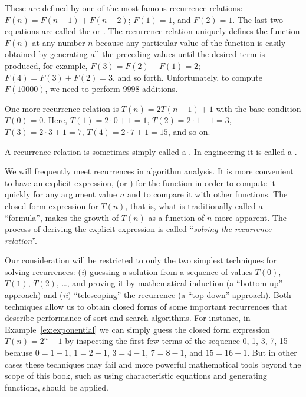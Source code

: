 \begin{Example}  
\label{ex:fibonacci}
These are defined by one of the most famous recurrence relations:
\(F(n) = F(n-1) + F(n-2)\); \(F(1)=1\), and \(F(2)=1\).
The last two equations are called the 
 or
. The recurrence relation
uniquely defines the function \(F(n)\)
at any number $n$ because any particular
value of the function is easily obtained by generating
all the preceding values until the desired term is produced,
for example, \(F(3)=F(2)+F(1)=2\); 
\(F(4)=F(3)+F(2)=3\), and so forth. Unfortunately, to
compute \(F(10000)\), we need to perform 9998 additions.
\end{Example}

\begin{Example} \label{ex:exponential}
One more recurrence relation is  
\(T(n) = 2  T(n-1) + 1\) with the base condition \(T(0) = 0\).
Here, $T(1) = 2\cdot 0 + 1 = 1$,
$T(2) = 2\cdot 1 +1 = 3$, $T(3) = 2\cdot 3 + 1 = 7$,
$T(4) = 2\cdot 7 + 1 = 15$,
and so on.
\end{Example}

\begin{note} 
A recurrence relation is sometimes simply called a {}.
In engineering it is called a {}.
\end{note}

We will frequently meet recurrences in algorithm
analysis. It is more convenient to have an explicit
expression, (or ) for the function 
in order to
compute it quickly for any argument
value \(n\) and to compare it with other functions. The closed-form
expression for $T(n)$, that is,
what is traditionally called a ``formula'', makes 
the growth of $T(n)$ as
a function of $n$ more apparent. The
process of deriving the explicit expression is called
``\emph{solving the recurrence relation}''.

Our consideration will be restricted to only the two
simplest techniques for solving recurrences:
(\textit{i}) guessing a solution from a sequence of values
\(T(0)\), \(T(1)\), \(T(2)\), \ldots, and
proving it by mathematical
induction (a ``bottom-up'' approach)
and (\textit{ii}) ``telescoping'' the
recurrence (a ``top-down'' approach). 
Both techniques allow us
to obtain closed forms of some important recurrences 
that describe performance of sort and search algorithms.
For instance, in Example~\ref{ex:exponential} we can simply guess 
the closed form expression $T(n)=2^{n}-1$
by inspecting the first few terms of the sequence
0, 1, 3, 7, 15 because $0=1-1$, $1 = 2 -1$, $3=4 -1$, $7=8 -1$,
and $15=16 -1$. But in
other cases these techniques may fail and more
powerful mathematical tools beyond the scope of this book, such as
using characteristic equations and generating functions, should be applied.

